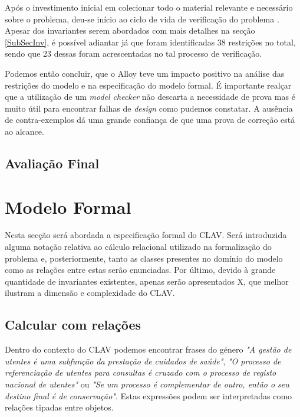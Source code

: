 \documentclass[tikz,runningheads,a4paper]{llncs}
\begin{document}
Após o investimento inicial em colecionar todo o material relevante e necessário sobre o problema, deu-se início ao ciclo de vida de verificação do problema \cite{jno}. Apesar dos invariantes serem abordados com mais detalhes na secção \ref{SubSecInv}, é possível adiantar já que foram identificadas 38 restrições no total, sendo que 23 dessas foram acrescentadas no tal processo de verificação.

Podemos então concluir, que o Alloy teve um impacto positivo na análise das restrições do modelo e na especificação do modelo formal. É importante realçar que a utilização de um \textit{model checker} não descarta a necessidade de prova mas é muito útil para encontrar falhas de \textit{design} como pudemos constatar. A ausência de contra-exemplos dá uma grande confiança de que uma prova de correção está ao alcance.

\subsection{Avaliação Final}

\section{Modelo Formal} \label{SecModel}

Nesta secção será abordada a especificação formal do CLAV. Será introduzida alguma notação relativa ao cálculo relacional utilizado na formalização do problema e, posteriormente, tanto as classes presentes no domínio do modelo como as relações entre estas serão enunciadas. Por último, devido à grande quantidade de invariantes existentes, apenas serão apresentados X, que melhor ilustram a dimensão e complexidade do CLAV. %

\subsection{Calcular com relações\cite{jno}\cite{jno-5}}

Dentro do contexto do CLAV podemos encontrar frases do género \textit{"A gestão de utentes é uma subfunção da prestação de cuidados de saúde"}, \textit{"O processo de referenciação de utentes para consultas é cruzado com o processo de registo nacional de utentes"} ou \textit{"Se um processo é complementar de outro, então o seu destino final é de conservação"}. Estas expressões podem ser interpretadas como relações tipadas entre objetos.
\end{document}
